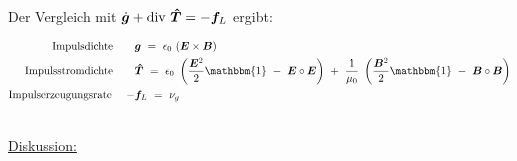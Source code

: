 \ \\
Der Vergleich mit $\dot{\bm{g}} + \text{div }\bm{\hat{T}} = - \bm{f}_L$ ergibt:

\begin{align*}
\text{Impulsdichte} \qquad & \vec{g} \ = \ \epsilon_0 \ (\vec{E}\times\vec{B})\\
\text{Impulsstromdichte} \qquad & \tens{T} \ = \ \epsilon_0 \ \left(\frac{\vec{E}^2}{2} \mathbbm{1} \ - \ \vec{E}\circ\vec{E}\right) \ + \ \frac{1}{\mu_0} \ \left(\frac{\vec{B}^2}{2}\mathbbm{1} \ - \ \vec{B}\circ\vec{B}\right)\\
\text{Impulserzeugungsrate} \quad \ - & \vec{f}_L \ = \ \nu_g
\end{align*}

\ \\
\underline{Diskussion:}

